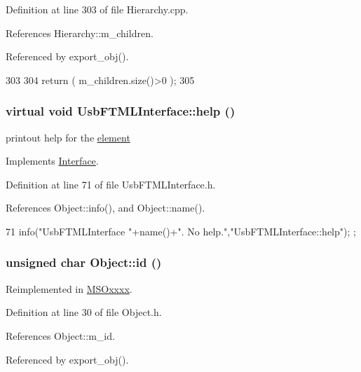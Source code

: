 Definition at line 303 of file Hierarchy.cpp.

References Hierarchy::m\_\-children.

Referenced by export\_\-obj().


\begin{DoxyCode}
303                               {
304   return ( m_children.size()>0 );
305 }
\end{DoxyCode}
\hypertarget{classUsbFTMLInterface_a1cfe65c58531afc07c21d876e21d8e46}{
\subsubsection[{help}]{\setlength{\rightskip}{0pt plus 5cm}virtual void UsbFTMLInterface::help ()}}
\label{classUsbFTMLInterface_a1cfe65c58531afc07c21d876e21d8e46}
printout help for the \hyperlink{namespaceelement}{element} 

Implements \hyperlink{classInterface_aedd3cf1d964c837e7848ccf81dc9c760}{Interface}.

Definition at line 71 of file UsbFTMLInterface.h.

References Object::info(), and Object::name().


\begin{DoxyCode}
71 { info("UsbFTMLInterface "+name()+". No help.","UsbFTMLInterface::help"); };
\end{DoxyCode}
\hypertarget{classObject_af99145335cc61ff6e2798ea17db009d2}{
\subsubsection[{id}]{\setlength{\rightskip}{0pt plus 5cm}unsigned char Object::id ()}}
\label{classObject_af99145335cc61ff6e2798ea17db009d2}


Reimplemented in \hyperlink{classMSOxxxx_a0f14b23d31d8e7647184e99a89600cc3}{MSOxxxx}.

Definition at line 30 of file Object.h.

References Object::m\_\-id.

Referenced by export\_\-obj().


